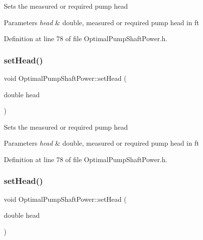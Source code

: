 Sets the measured or required pump head 
\begin{DoxyParams}{Parameters}
{\em head} & double, measured or required pump head in ft \\
\hline
\end{DoxyParams}


Definition at line 78 of file Optimal\+Pump\+Shaft\+Power.\+h.

\mbox{\label{class_optimal_pump_shaft_power_aa080c62ff92fc70a4e27e7710e490b62}} 
\subsubsection{\texorpdfstring{set\+Head()}{setHead()}\hspace{0.1cm}{\footnotesize\ttfamily [2/3]}}
{\footnotesize\ttfamily void Optimal\+Pump\+Shaft\+Power\+::set\+Head (\begin{DoxyParamCaption}\item[{double}]{head }\end{DoxyParamCaption})\hspace{0.3cm}{\ttfamily [inline]}}

Sets the measured or required pump head 
\begin{DoxyParams}{Parameters}
{\em head} & double, measured or required pump head in ft \\
\hline
\end{DoxyParams}


Definition at line 78 of file Optimal\+Pump\+Shaft\+Power.\+h.

\mbox{\label{class_optimal_pump_shaft_power_aa080c62ff92fc70a4e27e7710e490b62}} 
\subsubsection{\texorpdfstring{set\+Head()}{setHead()}\hspace{0.1cm}{\footnotesize\ttfamily [3/3]}}
{\footnotesize\ttfamily void Optimal\+Pump\+Shaft\+Power\+::set\+Head (\begin{DoxyParamCaption}\item[{double}]{head }\end{DoxyParamCaption})\hspace{0.3cm}{\ttfamily [inline]}}

